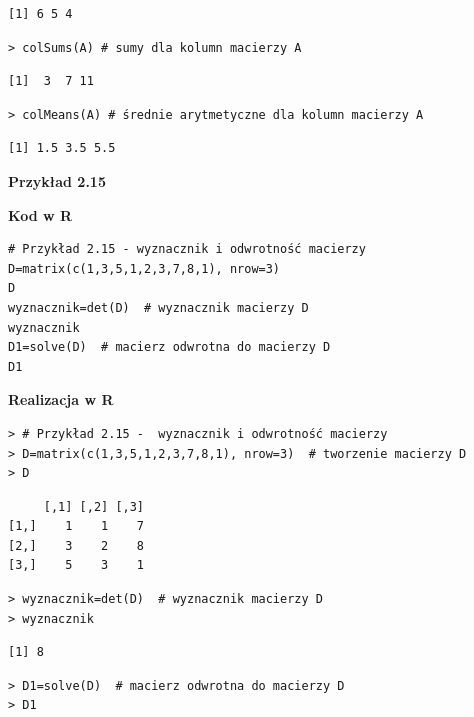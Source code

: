 \documentclass[12pt,B5paper,]{book}
\begin{document}
\begin{verbatim}
[1] 6 5 4
\end{verbatim}

\begin{verbatim}
> colSums(A) # sumy dla kolumn macierzy A
\end{verbatim}

\begin{verbatim}
[1]  3  7 11
\end{verbatim}

\begin{verbatim}
> colMeans(A) # średnie arytmetyczne dla kolumn macierzy A
\end{verbatim}

\begin{verbatim}
[1] 1.5 3.5 5.5
\end{verbatim}

\vspace{0.8cm} \textbf{Przykład 2.15}

\textbf{Kod w R}

\begin{verbatim}
# Przykład 2.15 - wyznacznik i odwrotność macierzy 
D=matrix(c(1,3,5,1,2,3,7,8,1), nrow=3)  
D
wyznacznik=det(D)  # wyznacznik macierzy D
wyznacznik
D1=solve(D)  # macierz odwrotna do macierzy D
D1
\end{verbatim}

\vspace{0.8cm} \textbf{Realizacja w R}

\begin{verbatim}
> # Przykład 2.15 -  wyznacznik i odwrotność macierzy
> D=matrix(c(1,3,5,1,2,3,7,8,1), nrow=3)  # tworzenie macierzy D
> D
\end{verbatim}

\begin{verbatim}
     [,1] [,2] [,3]
[1,]    1    1    7
[2,]    3    2    8
[3,]    5    3    1
\end{verbatim}

\begin{verbatim}
> wyznacznik=det(D)  # wyznacznik macierzy D
> wyznacznik
\end{verbatim}

\begin{verbatim}
[1] 8
\end{verbatim}

\begin{verbatim}
> D1=solve(D)  # macierz odwrotna do macierzy D
> D1
\end{verbatim}
\end{document}
